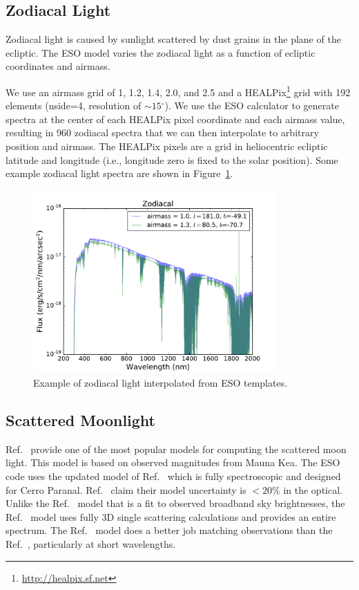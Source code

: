 \documentclass[]{spie}
\newcommand\degree{{^\circ}}
\begin{document}
\subsection{Zodiacal Light}

Zodiacal light is caused by sunlight scattered by dust grains in the plane of the ecliptic.  The ESO model varies the zodiacal light as a function of ecliptic coordinates and airmass.  

We use an airmass grid of 1, 1.2, 1.4, 2.0, and 2.5 and a HEALPix\footnote{\url{http://healpix.sf.net}} \cite{Gorski99} grid with 192 elements (nside=4, resolution of $\sim15\degree$).  We use the ESO calculator to generate spectra at the center of each HEALPix pixel coordinate and each airmass value, resulting in 960 zodiacal spectra that we can then interpolate to arbitrary position and airmass.  The HEALPix pixels are a grid in heliocentric ecliptic latitude and longitude (i.e., longitude zero is fixed to the solar position).  Some example zodiacal light spectra are shown in Figure~\ref{fig:zodiacal}. 


\begin{figure}[ht]
  \begin{center}
  \includegraphics[height=7cm]{plots/zodiacal.pdf}
  \end{center}
  \caption{Example of zodiacal light interpolated from ESO templates. \label{fig:zodiacal}}
\end{figure}


\subsection{Scattered Moonlight}

Ref.~ provide one of the most popular models for computing the scattered moon light. This model is based on observed magnitudes from Mauna Kea. The ESO code uses the updated model of Ref.~ which is fully spectroscopic and designed for Cerro Paranal. Ref.~ claim their model uncertainty is $<20$\% in the optical.  Unlike the Ref.~ model that is a fit to observed broadband sky brightnesses, the Ref.~ model uses fully 3D single scattering calculations and provides an entire spectrum. The Ref.~ model does a better job matching observations than the Ref.~, particularly at short wavelengths.
\end{document}

